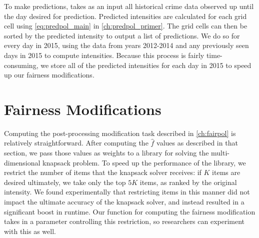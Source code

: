 To make predictions, \pp takes as an input all historical crime data observed up until the day desired for prediction. Predicted intensities are calculated for each grid cell using \autoref{eq:predpol_main} in \autoref{ch:predpol_primer}. The grid cells can then be sorted by the predicted intensity to output a list of predictions. We do so for every day in 2015, using the data from years 2012-2014 and any previously seen days in 2015 to compute intensities. Because this process is fairly time-consuming, we store all of the predicted intensities for each day in 2015 to speed up our fairness modifications.

\section{Fairness Modifications}
Computing the post-processing modification task described in \autoref{ch:fairpol} is relatively straightforward. After computing the $\hat{f}$ values as described in that section, we pass those values as weights to a library for solving the multi-dimensional knapsack problem. To speed up the performance of the library, we restrict the number of items that the knapsack solver receives: if $K$ items are desired ultimately, we take only the top $5K$ items, as ranked by the original \pp intensity. We found experimentally that restricting items in this manner did not impact the ultimate accuracy of the knapsack solver, and instead resulted in a significant boost in runtime. Our function for computing the fairness modification takes in a parameter controlling this restriction, so researchers can experiment with this as well.


